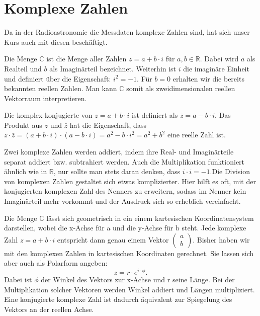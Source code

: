 \documentclass[]{dsadokumentation}
\begin{document}
\section{Komplexe Zahlen}
Da in der Radioastronomie die Messdaten komplexe Zahlen sind, hat sich unser Kurs auch mit diesen beschäftigt.

Die Menge $\mathbb{C}$ ist die Menge aller Zahlen $z=a+b\cdot i$ für $a, b \in \mathbb{R}$. Dabei wird $a$ als Realteil und $b$ als Imaginärteil bezeichnet. Weiterhin ist $i$ die imagin\"are Einheit und definiert über die Eigenschaft: $i^{2} = -1$. Für $b = 0$ erhalten wir die bereits bekannten reellen Zahlen. Man kann $\mathbb{C}$ somit als zweidimensionalen reellen Vektorraum interpretieren.

Die komplex konjugierte von $z=a+b\cdot i$ ist definiert als $\bar{z}=a-b\cdot i$. Das Produkt aus $z$ und $\bar{z}$ hat die Eigenschaft, dass $z\cdot \bar{z}=(a+b\cdot i)\cdot (a-b\cdot i)=a^2-b\cdot i^2=a^2+b^2$ eine reelle Zahl ist.

Zwei komplexe Zahlen werden addiert, indem ihre Real- und Imaginärteile separat addiert bzw. subtrahiert werden. Auch die Multiplikation funktioniert ähnlich wie in $\mathbb{R}$, nur sollte man stets daran denken, dass $i\cdot i=-1$.Die Division von komplexen Zahlen gestaltet sich etwas komplizierter. Hier hilft es oft, mit der konjugierten komplexen Zahl des Nenners zu erweitern, sodass im Nenner kein Imaginärteil mehr vorkommt und der Ausdruck sich so erheblich vereinfacht.

Die Menge $\mathbb{C}$ lässt sich geometrisch in ein einem kartesischen Koordinatensystem darstellen, wobei die x-Achse für a und die y-Achse für b steht. Jede komplexe Zahl $z=a+b\cdot i$ entspricht dann genau einem Vektor $\begin{pmatrix} a\\b
\end{pmatrix}$.
Bisher haben wir mit den komplexen Zahlen in kartesischen Koordinaten gerechnet. Sie lassen sich aber auch als Polarform angeben:
\begin{displaymath}
z=r\cdot e^{i\cdot\phi}.
\end{displaymath}
Dabei ist $\phi$ der Winkel des Vektors zur x-Achse und r seine Länge. Bei der Multiplikation solcher Vektoren werden Winkel addiert und Längen multipliziert. Eine konjugierte komplexe Zahl ist dadurch äquivalent zur Spiegelung des Vektors an der reellen Achse.
\end{document}
